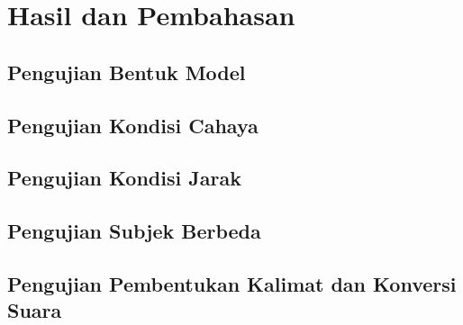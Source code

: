 \section{Hasil dan Pembahasan}
\label{sec:hasildanpembahasan}




% 


\subsection{Pengujian Bentuk Model}
\label{sec:analisismodel}

\subsection{Pengujian Kondisi Cahaya}
\label{sec:analisiscahaya}

\subsection{Pengujian Kondisi Jarak}
\label{sec:analisisjarak}

\subsection{Pengujian Subjek Berbeda}
\label{sec:analisissubjek}

\subsection{Pengujian Pembentukan Kalimat dan Konversi Suara}
\label{sec:analisiskalimat}